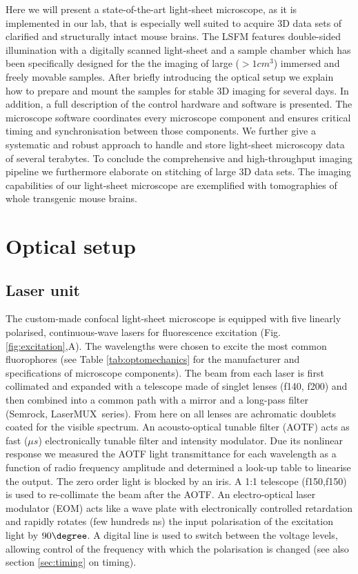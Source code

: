 \documentclass[12pt]{spieman}  %
\begin{document}
\begin{spacing}{2}
Here we will present a state-of-the-art light-sheet microscope, as it is implemented in our lab, that is especially well suited to acquire 3D data sets of clarified and structurally intact mouse brains. The LSFM features double-sided illumination with a digitally scanned light-sheet and a sample chamber which has been specifically designed for the the imaging of large ($> 1cm^3$) immersed and freely movable samples. After briefly introducing the optical setup we explain how to prepare and mount the samples for stable 3D imaging for several days. In addition, a full description of the control hardware and software is presented. The microscope software coordinates every microscope component and ensures critical timing and synchronisation between those components. We further give a systematic and robust approach to handle and store light-sheet microscopy data of several terabytes. To conclude the comprehensive and high-throughput imaging pipeline we furthermore elaborate on stitching of large 3D data sets. The imaging capabilities of our light-sheet microscope are exemplified with tomographies of whole transgenic mouse brains.

\section{Optical setup}

\subsection{Laser unit}		
The custom-made confocal light-sheet microscope is equipped with five linearly polarised, continuous-wave lasers for fluorescence excitation (Fig. \ref{fig:excitation},A). The wavelengths were chosen to excite the most common fluorophores (see Table \ref{tab:optomechanics} for the manufacturer and specifications of microscope components). The beam from each laser is first collimated and expanded with a telescope made of singlet lenses (f140, f200) and then combined into a common path with a mirror and a long-pass filter (Semrock, LaserMUX\texttrademark\ series). From here on all lenses are achromatic doublets coated for the visible spectrum. An acousto-optical tunable filter (AOTF) acts as fast ($\mu s$) electronically tunable filter and intensity modulator. Due its nonlinear response we measured the AOTF light transmittance for each wavelength as a function of radio frequency amplitude and determined a look-up table to linearise the output. The zero order light is blocked by an iris. A 1:1 telescope (f150,f150) is used to re-collimate the beam after the AOTF. An electro-optical laser modulator (EOM) acts like a wave plate with electronically controlled retardation and rapidly rotates (few hundreds ns) the input polarisation of the excitation light by $90\degree$. A digital line is used to switch between the voltage levels, allowing control of the frequency with which the polarisation is changed (see also section \ref{sec:timing} on timing).


\end{spacing}
\end{document}
